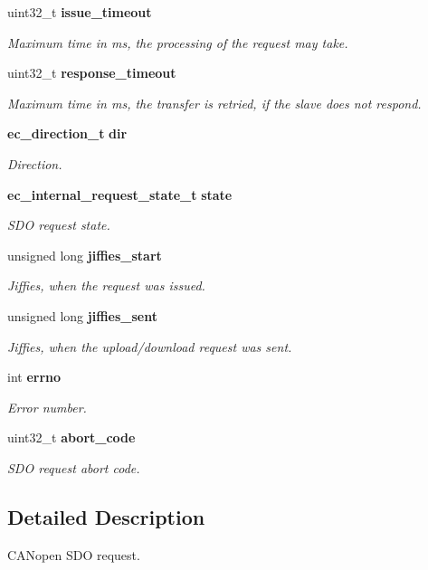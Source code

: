 \begin{DoxyCompactItemize}
uint32\-\_\-t {\bf issue\-\_\-timeout}
\begin{DoxyCompactList}\small\item\em Maximum time in ms, the processing of the request may take. \end{DoxyCompactList}\item 
uint32\-\_\-t {\bf response\-\_\-timeout}
\begin{DoxyCompactList}\small\item\em Maximum time in ms, the transfer is retried, if the slave does not respond. \end{DoxyCompactList}\item 
{\bf ec\-\_\-direction\-\_\-t} {\bf dir}
\begin{DoxyCompactList}\small\item\em Direction. \end{DoxyCompactList}\item 
{\bf ec\-\_\-internal\-\_\-request\-\_\-state\-\_\-t} {\bf state}
\begin{DoxyCompactList}\small\item\em S\-D\-O request state. \end{DoxyCompactList}\item 
unsigned long {\bf jiffies\-\_\-start}
\begin{DoxyCompactList}\small\item\em Jiffies, when the request was issued. \end{DoxyCompactList}\item 
unsigned long {\bf jiffies\-\_\-sent}
\begin{DoxyCompactList}\small\item\em Jiffies, when the upload/download request was sent. \end{DoxyCompactList}\item 
int {\bf errno}
\begin{DoxyCompactList}\small\item\em Error number. \end{DoxyCompactList}\item 
uint32\-\_\-t {\bf abort\-\_\-code}
\begin{DoxyCompactList}\small\item\em S\-D\-O request abort code. \end{DoxyCompactList}\end{DoxyCompactItemize}


\subsection{Detailed Description}
C\-A\-Nopen S\-D\-O request. 


